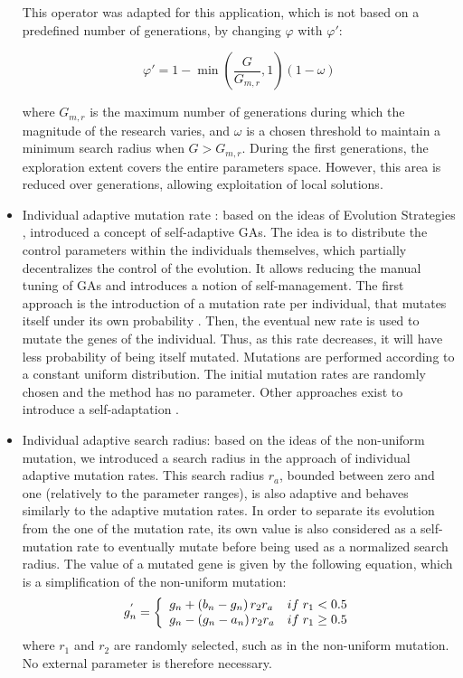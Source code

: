 \documentclass{ametsoc}
\begin{document}
\begin{itemize}
	This operator was adapted for this application, which is not based on a predefined number of generations, by changing $\varphi$ with $\varphi'$:
	
	\begin{equation}
	\varphi' = 1 - \min \left( \dfrac{G}{G_{m,r}}, 1 \right) \left(1-\omega\right)
	\end{equation}
	
	where $G_{m,r}$ is the maximum number of generations during which the magnitude of the research varies, and $\omega$ is a chosen threshold to maintain a minimum search radius when $G>G_{m,r}$. During the first generations, the exploration extent covers the entire parameters space. However, this area is reduced over generations, allowing exploitation of local solutions.
	
	\item Individual adaptive mutation rate \citep{Back1992a}: based on the ideas of Evolution Strategies \citep[see][]{Rechenberg1973, Schwefel1981}, \citet{Back1992a} introduced a concept of self-adaptive GAs. The idea is to distribute the control parameters within the individuals themselves, which partially decentralizes the control of the evolution. It allows reducing the manual tuning of GAs and introduces a notion of self-management. The first approach is the introduction of a mutation rate per individual, that mutates itself under its own probability \citep{Back1992a}. Then, the eventual new rate is used to mutate the genes of the individual. Thus, as this rate decreases, it will have less probability of being itself mutated. Mutations are performed according to a constant uniform distribution. The initial mutation rates are randomly chosen \citep{Back1992a} and the method has no parameter. Other approaches exist to introduce a self-adaptation \citep[see][]{Smith1997a, Deb1999, Deb2001a}.
	
	\item Individual adaptive search radius: based on the ideas of the non-uniform mutation, we introduced a search radius in the approach of individual adaptive mutation rates. This search radius $r_{a}$, bounded between zero and one (relatively to the parameter ranges), is also adaptive and behaves similarly to the adaptive mutation rates. In order to separate its evolution from the one of the mutation rate, its own value is also considered as a self-mutation rate to eventually mutate before being used as a normalized search radius. The value of a mutated gene is given by the following equation, which is a simplification of the non-uniform mutation:
	\begin{equation}
	g_{n}^{'} = 
	\left\lbrace \begin{array}{l l} 
	g_{n} + \left(b_{n}-g_{n}\right) r_{2} r_{a} & if \; r_{1} < 0.5 \\
	g_{n} - \left(g_{n}-a_{n}\right) r_{2} r_{a} & if \; r_{1} \geq 0.5 \\
	\end{array} \right.
	\label{eq:adaptive_search_radius_mutation}
	\end{equation}
	where $r_{1}$ and $r_{2}$ are randomly selected, such as in the non-uniform mutation. No external parameter is therefore necessary.
	

\end{itemize}
\end{document}
